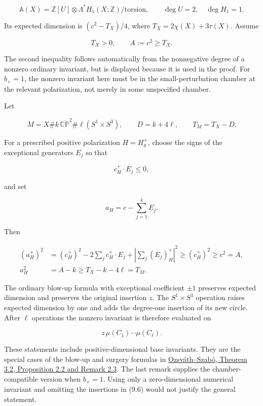 \documentclass[
  10pt,
]{article}
\begin{document}
\[
 \mathbb A(X)=\mathbb Z[U]\otimes\Lambda^*H_1(X;\mathbb Z)/\mathrm{torsion},
                 \qquad\deg U=2,\quad\deg H_1=1.
\]

Its expected dimension is \((c^2-T_X)/4\), where
\(T_X=2\chi(X)+3\tau(X)\). Assume

\[
                    T_X>0,\qquad A:=c^2\ge T_X.          \tag{9.2}
\]

The second inequality follows automatically from the nonnegative degree
of a nonzero ordinary invariant, but is displayed because it is used in
the proof. For \(b_+=1\), the nonzero invariant here must be in the
small-perturbation chamber at the relevant polarization, not merely in
some unspecified chamber.

Let

\[
 M=X\#k\,\overline{\mathbb{CP}}^{2}\#\ell(S^1\times S^3),
 \qquad D=k+4\ell,\qquad T_M=T_X-D.                      \tag{9.3}
\]

For a prescribed positive polarization \(H=H_g^+\), choose the signs of
the exceptional generators \(E_j\) so that

\[
                         c_H^+\mathbin\cdot E_j\le0,
\]

and set

\[
                             a_H=c-\sum_{j=1}^kE_j.
 \tag{9.4}
\]

Then

\[
 \begin{aligned}
 (a_H^+)^2
   &=(c_H^+)^2-2\sum_jc_H^+\mathbin\cdot E_j
                              +\left|\sum_j(E_j)_H^+\right|^2
      \ge(c_H^+)^2\ge c^2=A,\\
 a_H^2&=A-k\ge T_X-k-4\ell=T_M.
 \end{aligned}                                              \tag{9.5}
\]

The ordinary blow-up formula with exceptional coefficient \(\pm1\)
preserves expected dimension and preserves the original insertion \(z\).
The \(S^1\times S^3\) operation raises expected dimension by one and
adds the degree-one insertion of its new circle. After \(\ell\)
operations the nonzero invariant is therefore evaluated on

\[
                           z\,\mu(C_1)\cdots\mu(C_\ell).
 \tag{9.6}
\]

These statements include positive-dimensional base invariants. They are
the special cases of the blow-up and surgery formulas in
\href{https://arxiv.org/pdf/math/0005268}{Ozsváth--Szabó, Theorem 3.2,
Proposition 2.2 and Remark 2.3}. The last remark supplies the
chamber-compatible version when \(b_+=1\). Using only a zero-dimensional
numerical invariant and omitting the insertions in (9.6) would not
justify the general statement.
\end{document}
